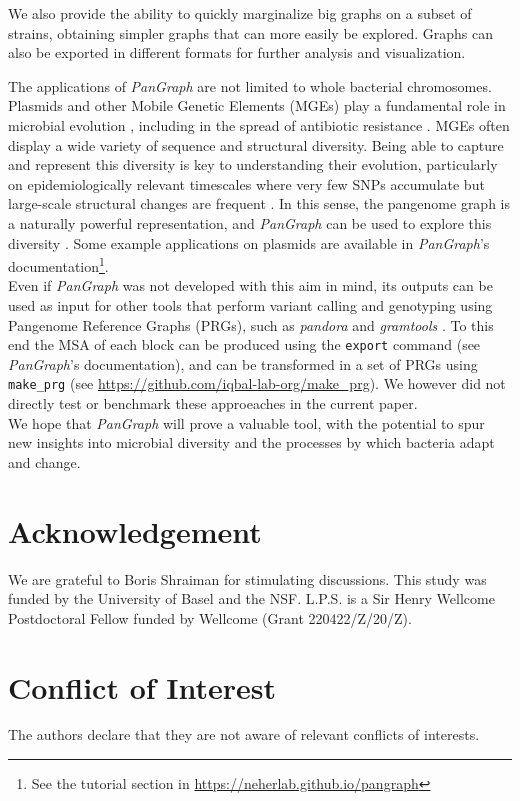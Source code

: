 \documentclass[aps,rmp,preprint,superscriptaddress,10pt,linenumbers]{revtex4-1}
\begin{document}
We also provide the ability to quickly marginalize big graphs on a subset of strains, obtaining simpler graphs that can more easily be explored. Graphs can also be exported in different formats for further analysis and visualization.

The applications of \textit{PanGraph} are not limited to whole bacterial chromosomes. Plasmids and other Mobile Genetic Elements (MGEs) play a fundamental role in microbial evolution \cite{haudiquet2022selfish,frost2005mobile}, including in the spread of antibiotic resistance \cite{van2018spread}. MGEs often display a wide variety of sequence and structural diversity. Being able to capture and represent this diversity is key to understanding their evolution, particularly on epidemiologically relevant timescales where very few SNPs accumulate but large-scale structural changes are frequent \cite{Sheppard2016, Noll2018}.
In this sense, the pangenome graph is a naturally powerful representation, and \textit{PanGraph} can be used to explore this diversity \cite{shaw_preparation}. Some example applications on plasmids are available in \textit{PanGraph}'s documentation\footnote{See the tutorial section in \url{https://neherlab.github.io/pangraph}}.\\
Even if \textit{PanGraph} was not developed with this aim in mind, its outputs can be used as input for other tools that perform variant calling and genotyping using Pangenome Reference Graphs (PRGs), such as \textit{pandora} \cite{colquhoun2021pandora} and \textit{gramtools} \cite{letcher2021gramtools}. To this end the MSA of each block can be produced using the \texttt{export} command (see \textit{PanGraph}'s documentation), and can be transformed in a set of PRGs using \texttt{make\_prg} (see \url{https://github.com/iqbal-lab-org/make_prg}). We however did not directly test or benchmark these approeaches in the current paper.\\

We hope that \textit{PanGraph} will prove a valuable tool, with the potential to spur new insights into microbial diversity and the processes by which bacteria adapt and change.


\section*{Acknowledgement}
We are grateful to Boris Shraiman for stimulating discussions.
This study was funded by the University of Basel and the NSF.
L.P.S. is a Sir Henry Wellcome Postdoctoral Fellow funded by Wellcome (Grant 220422/Z/20/Z).

\section*{Conflict of Interest}
The authors declare that they are not aware of relevant conflicts of interests.

{}
\end{document}
